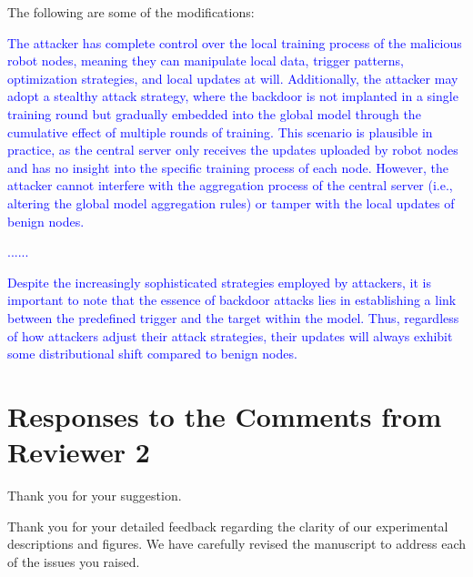 \documentclass[a4paper,twoside,11pt,dvipsnames]{reviewresponse}
\begin{document}
The following are some of the modifications:

\textcolor{blue}{The attacker has complete control over the local training process of the malicious robot nodes, meaning they can manipulate local data, trigger patterns, optimization strategies, and local updates at will. Additionally, the attacker may adopt a stealthy attack strategy, where the backdoor is not implanted in a single training round but gradually embedded into the global model through the cumulative effect of multiple rounds of training. This scenario is plausible in practice, as the central server only receives the updates uploaded by robot nodes and has no insight into the specific training process of each node. However, the attacker cannot interfere with the aggregation process of the central server (i.e., altering the global model aggregation rules) or tamper with the local updates of benign nodes.}

\textcolor{blue}{......}

\textcolor{blue}{Despite the increasingly sophisticated strategies employed by attackers, it is important to note that the essence of backdoor attacks lies in establishing a link between the predefined trigger and the target within the model. Thus, regardless of how attackers adjust their attack strategies, their updates will always exhibit some distributional shift compared to benign nodes.}


\newpage

\section{Responses to the Comments from Reviewer 2}


Thank you for your suggestion.


Thank you for your detailed feedback regarding the clarity of our experimental descriptions and figures. We have carefully revised the manuscript to address each of the issues you raised. 
\end{document}
